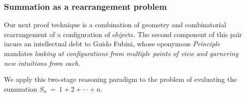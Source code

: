 \subsubsection{Summation as a rearrangement problem}
\label{sec:summation-via-Fubini}

Our next proof technique is a combination of geometry and combinatorial rearrangement of a configuration of objects.  The second component of this pair incurs an intellectual debt to Guido Fubini, whose eponymous {\em Principle} mandates {\em looking at configurations from multiple points of view and garnering new intuitions from each}.
 

\smallskip

We apply this two-stage reasoning paradigm to the problem of evaluating the summation $S_n \ = \ 1 + 2 + \cdots + n$.

